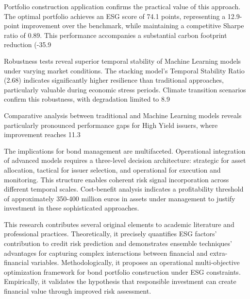 Portfolio construction application confirms the practical value of this approach. The optimal portfolio achieves an ESG score of 74.1 points, representing a 12.9-point improvement over the benchmark, while maintaining a competitive Sharpe ratio of 0.89. This performance accompanies a substantial carbon footprint reduction (-35.9%

Robustness tests reveal superior temporal stability of Machine Learning models under varying market conditions. The stacking model's Temporal Stability Ratio (2.68) indicates significantly higher resilience than traditional approaches, particularly valuable during economic stress periods. Climate transition scenarios confirm this robustness, with degradation limited to 8.9%

Comparative analysis between traditional and Machine Learning models reveals particularly pronounced performance gaps for High Yield issuers, where improvement reaches 11.3%

The implications for bond management are multifaceted. Operational integration of advanced models requires a three-level decision architecture: strategic for asset allocation, tactical for issuer selection, and operational for execution and monitoring. This structure enables coherent risk signal incorporation across different temporal scales. Cost-benefit analysis indicates a profitability threshold of approximately 350-400 million euros in assets under management to justify investment in these sophisticated approaches.

This research contributes several original elements to academic literature and professional practices. Theoretically, it precisely quantifies ESG factors' contribution to credit risk prediction and demonstrates ensemble techniques' advantages for capturing complex interactions between financial and extra-financial variables. Methodologically, it proposes an operational multi-objective optimization framework for bond portfolio construction under ESG constraints. Empirically, it validates the hypothesis that responsible investment can create financial value through improved risk assessment.

